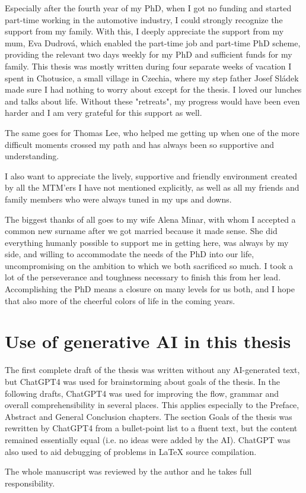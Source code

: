 Especially after the fourth year of my PhD, when I got no funding and started part-time working in the automotive industry, I could strongly recognize the support from my family. With this, I deeply appreciate the support from my mum, Eva Dudrová, which enabled the part-time job and part-time PhD scheme, providing the relevant two days weekly for my PhD and sufficient funds for my family. This thesis was mostly written during four separate weeks of vacation I spent in Chotusice, a small village in Czechia, where my step father Josef Sládek made sure I had nothing to worry about except for the thesis. I loved our lunches and talks about life. Without these "retreats", my progress would have been even harder and I am very grateful for this support as well. 

The same goes for Thomas Lee, who helped me getting up when one of the more difficult moments crossed my path and has always been so supportive and understanding.

I also want to appreciate the lively, supportive and friendly environment created by all the MTM'ers I have not mentioned explicitly, as well as all my friends and family members who were always tuned in my ups and downs. 

The biggest thanks of all goes to my wife Alena Minar, with whom I accepted a common new surname after we got married because it made sense. She did everything humanly possible to support me in getting here, was always by my side, and willing to accommodate the needs of the PhD into our life, uncompromising on the ambition to which we both sacrificed so much. I took a lot of the perseverance and toughness necessary to finish this from her lead. Accomplishing the PhD means a closure on many levels for us both, and I hope that also more of the cheerful colors of life in the coming years. 

\section*{Use of generative AI in this thesis}
The first complete draft of the thesis was written without any AI-generated text, but ChatGPT4 was used for brainstorming about goals of the thesis. In the following drafts, ChatGPT4 was used for improving the flow, grammar and overall comprehensibility in several places. This applies especially to the Preface, Abstract and General Conclusion chapters. The section Goals of the thesis was rewritten by ChatGPT4 from a bullet-point list to a fluent text, but the content remained essentially equal (i.e. no ideas were added by the AI). ChatGPT was also used to aid debugging of problems in LaTeX source compilation.

The whole manuscript was reviewed by the author and he takes full responsibility.

\cleardoublepage

